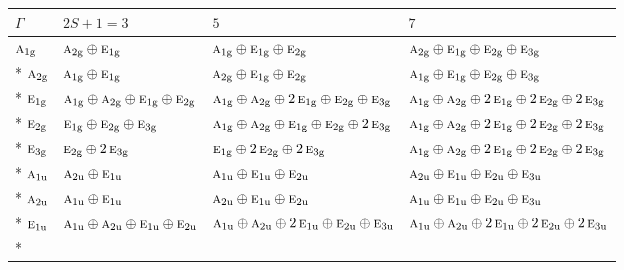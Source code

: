 \documentclass[10pt,a4paper]{article}
\numberwithin{equation}{section}
\newcommand{\irr}[1]{\text{\normalfont\scshape #1}}
\newcommand{\ptag}[1]{\mathrm{#1}}
\begin{document}
{\small\setlength{\tabcolsep}{3pt}\begin{longtable}{@{}llll@{}}\toprule
$\Gamma$ & $2S + 1 = 3$ & $5$ & $7$\\\midrule\endhead
\bottomrule\endfoot\endlastfoot
$\irr{a}_{1\ptag{g}}$ & $\irr{a}_{2\ptag{g}}\oplus \irr{e}_{1\ptag{g}}$ & $\irr{a}_{1\ptag{g}}\oplus \irr{e}_{1\ptag{g}}\oplus \irr{e}_{2\ptag{g}}$ & $\irr{a}_{2\ptag{g}}\oplus \irr{e}_{1\ptag{g}}\oplus \irr{e}_{2\ptag{g}}\oplus \irr{e}_{3\ptag{g}}$\\*
$\irr{a}_{2\ptag{g}}$ & $\irr{a}_{1\ptag{g}}\oplus \irr{e}_{1\ptag{g}}$ & $\irr{a}_{2\ptag{g}}\oplus \irr{e}_{1\ptag{g}}\oplus \irr{e}_{2\ptag{g}}$ & $\irr{a}_{1\ptag{g}}\oplus \irr{e}_{1\ptag{g}}\oplus \irr{e}_{2\ptag{g}}\oplus \irr{e}_{3\ptag{g}}$\\*
$\irr{e}_{1\ptag{g}}$ & $\irr{a}_{1\ptag{g}}\oplus \irr{a}_{2\ptag{g}}\oplus \irr{e}_{1\ptag{g}}\oplus \irr{e}_{2\ptag{g}}$ & $\irr{a}_{1\ptag{g}}\oplus \irr{a}_{2\ptag{g}}\oplus 2\,\irr{e}_{1\ptag{g}}\oplus \irr{e}_{2\ptag{g}}\oplus \irr{e}_{3\ptag{g}}$ & $\irr{a}_{1\ptag{g}}\oplus \irr{a}_{2\ptag{g}}\oplus 2\,\irr{e}_{1\ptag{g}}\oplus 2\,\irr{e}_{2\ptag{g}}\oplus 2\,\irr{e}_{3\ptag{g}}$\\*
$\irr{e}_{2\ptag{g}}$ & $\irr{e}_{1\ptag{g}}\oplus \irr{e}_{2\ptag{g}}\oplus \irr{e}_{3\ptag{g}}$ & $\irr{a}_{1\ptag{g}}\oplus \irr{a}_{2\ptag{g}}\oplus \irr{e}_{1\ptag{g}}\oplus \irr{e}_{2\ptag{g}}\oplus 2\,\irr{e}_{3\ptag{g}}$ & $\irr{a}_{1\ptag{g}}\oplus \irr{a}_{2\ptag{g}}\oplus 2\,\irr{e}_{1\ptag{g}}\oplus 2\,\irr{e}_{2\ptag{g}}\oplus 2\,\irr{e}_{3\ptag{g}}$\\*
$\irr{e}_{3\ptag{g}}$ & $\irr{e}_{2\ptag{g}}\oplus 2\,\irr{e}_{3\ptag{g}}$ & $\irr{e}_{1\ptag{g}}\oplus 2\,\irr{e}_{2\ptag{g}}\oplus 2\,\irr{e}_{3\ptag{g}}$ & $\irr{a}_{1\ptag{g}}\oplus \irr{a}_{2\ptag{g}}\oplus 2\,\irr{e}_{1\ptag{g}}\oplus 2\,\irr{e}_{2\ptag{g}}\oplus 2\,\irr{e}_{3\ptag{g}}$\\*
$\irr{a}_{1\ptag{u}}$ & $\irr{a}_{2\ptag{u}}\oplus \irr{e}_{1\ptag{u}}$ & $\irr{a}_{1\ptag{u}}\oplus \irr{e}_{1\ptag{u}}\oplus \irr{e}_{2\ptag{u}}$ & $\irr{a}_{2\ptag{u}}\oplus \irr{e}_{1\ptag{u}}\oplus \irr{e}_{2\ptag{u}}\oplus \irr{e}_{3\ptag{u}}$\\*
$\irr{a}_{2\ptag{u}}$ & $\irr{a}_{1\ptag{u}}\oplus \irr{e}_{1\ptag{u}}$ & $\irr{a}_{2\ptag{u}}\oplus \irr{e}_{1\ptag{u}}\oplus \irr{e}_{2\ptag{u}}$ & $\irr{a}_{1\ptag{u}}\oplus \irr{e}_{1\ptag{u}}\oplus \irr{e}_{2\ptag{u}}\oplus \irr{e}_{3\ptag{u}}$\\*
$\irr{e}_{1\ptag{u}}$ & $\irr{a}_{1\ptag{u}}\oplus \irr{a}_{2\ptag{u}}\oplus \irr{e}_{1\ptag{u}}\oplus \irr{e}_{2\ptag{u}}$ & $\irr{a}_{1\ptag{u}}\oplus \irr{a}_{2\ptag{u}}\oplus 2\,\irr{e}_{1\ptag{u}}\oplus \irr{e}_{2\ptag{u}}\oplus \irr{e}_{3\ptag{u}}$ & $\irr{a}_{1\ptag{u}}\oplus \irr{a}_{2\ptag{u}}\oplus 2\,\irr{e}_{1\ptag{u}}\oplus 2\,\irr{e}_{2\ptag{u}}\oplus 2\,\irr{e}_{3\ptag{u}}$\\*

\end{longtable}}
\end{document}
